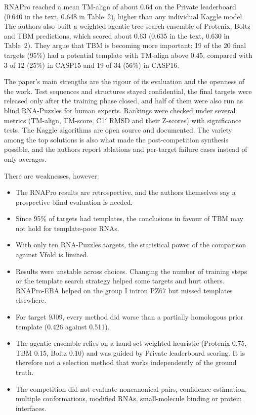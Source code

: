 \documentclass{FastFyp}
\begin{document}
RNAPro reached a mean TM-align of about 0.64 on the Private leaderboard (0.640 in the text, 0.648 in Table~2), higher than any individual Kaggle model. The authors also built a weighted agentic tree-search ensemble of Protenix, Boltz and TBM predictions, which scored about 0.63 (0.635 in the text, 0.630 in Table~2). They argue that TBM is becoming more important: 19 of the 20 final targets (95\%) had a potential template with TM-align above 0.45, compared with 3 of 12 (25\%) in CASP15 and 19 of 34 (56\%) in CASP16.

The paper's main strengths are the rigour of its evaluation and the openness of the work. Test sequences and structures stayed confidential, the final targets were released only after the training phase closed, and half of them were also run as blind RNA-Puzzles for human experts. Rankings were checked under several metrics (TM-align, TM-score, C1$'$ RMSD and their Z-scores) with significance tests. The Kaggle algorithms are open source and documented. The variety among the top solutions is also what made the post-competition synthesis possible, and the authors report ablations and per-target failure cases instead of only averages.

There are weaknesses, however:
\begin{itemize}
\item The RNAPro results are retrospective, and the authors themselves say a prospective blind evaluation is needed.
\item Since 95\% of targets had templates, the conclusions in favour of TBM may not hold for template-poor RNAs.
\item With only ten RNA-Puzzles targets, the statistical power of the comparison against Vfold is limited.
\item Results were unstable across choices. Changing the number of training steps or the template search strategy helped some targets and hurt others. RNAPro-EBA helped on the group I intron PZ67 but missed templates elsewhere.
\item For target 9J09, every method did worse than a partially homologous prior template (0.426 against 0.511).
\item The agentic ensemble relies on a hand-set weighted heuristic (Protenix 0.75, TBM 0.15, Boltz 0.10) and was guided by Private leaderboard scoring. It is therefore not a selection method that works independently of the ground truth.
\item The competition did not evaluate noncanonical pairs, confidence estimation, multiple conformations, modified RNAs, small-molecule binding or protein interfaces.
\end{itemize}
\end{document}
